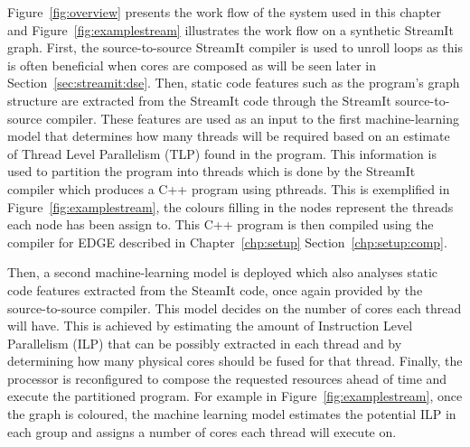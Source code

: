 Figure~\ref{fig:overview} presents the work flow of the system used in this chapter and Figure~\ref{fig:examplestream} illustrates the work flow on a synthetic StreamIt graph.
First, the source-to-source StreamIt compiler is used to unroll loops as this is often beneficial when cores are composed as will be seen later in Section~\ref{sec:streamit:dse}.
Then, static code features such as the program's graph structure are extracted from the StreamIt code through the StreamIt source-to-source compiler.
These features are used as an input to the first machine-learning model that determines how many threads will be required based on an estimate of Thread Level Parallelism (TLP) found in the program.
This information is used to partition the program into threads which is done by the StreamIt compiler which produces a C++ program using pthreads.
This is exemplified in Figure~\ref{fig:examplestream}, the colours filling in the nodes represent the threads each node has been assign to.
This C++ program is then compiled using the compiler for EDGE described in Chapter~\ref{chp:setup} Section~\ref{chp:setup:comp}.

Then, a second machine-learning model is deployed which also analyses static code features extracted from the SteamIt code, once again provided by the source-to-source compiler.
This model decides on the number of cores each thread will have.
This is achieved by estimating the amount of Instruction Level Parallelism (ILP) that can be possibly extracted in each thread and by determining how many physical cores should be fused for that thread.
Finally, the processor is reconfigured to compose the requested resources ahead of time and execute the partitioned program.
For example in Figure~\ref{fig:examplestream}, once the graph is coloured, the machine learning model estimates the potential ILP in each group and assigns a number of cores each thread will execute on.

